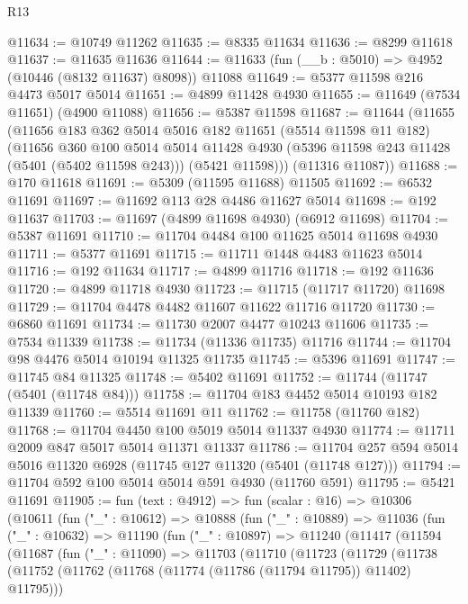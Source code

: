 \begin{lexlean}{R13}
\begin{coremodule}
@11634 := @10749 @11262
@11635 := @8335 @11634
@11636 := @8299 @11618
@11637 := @11635 @11636
@11644 := @11633 (fun (__b : @5010) => @4952 (@10446 (@8132 @11637) @8098)) @11088
@11649 := @5377 @11598 @216 @4473 @5017 @5014
@11651 := @4899 @11428 @4930
@11655 := @11649 (@7534 @11651) (@4900 @11088)
@11656 := @5387 @11598
@11687 := @11644
    (@11655
      (@11656
        @183
        @362
        @5014
        @5016
        @182
        @11651
        (@5514 @11598 @11 @182)
        (@11656
          @360
          @100
          @5014
          @5014
          @11428
          @4930
          (@5396 @11598 @243 @11428 (@5401 (@5402 @11598 @243)))
          (@5421 @11598)))
      (@11316 @11087))
@11688 := @170 @11618
@11691 := @5309 (@11595 @11688) @11505
@11692 := @6532 @11691
@11697 := @11692 @113 @28 @4486 @11627 @5014
@11698 := @192 @11637
@11703 := @11697 (@4899 @11698 @4930) (@6912 @11698)
@11704 := @5387 @11691
@11710 := @11704 @4484 @100 @11625 @5014 @11698 @4930
@11711 := @5377 @11691
@11715 := @11711 @1448 @4483 @11623 @5014
@11716 := @192 @11634
@11717 := @4899 @11716
@11718 := @192 @11636
@11720 := @4899 @11718 @4930
@11723 := @11715 (@11717 @11720) @11698
@11729 := @11704 @4478 @4482 @11607 @11622 @11716 @11720
@11730 := @6860 @11691
@11734 := @11730 @2007 @4477 @10243 @11606
@11735 := @7534 @11339
@11738 := @11734 (@11336 @11735) @11716
@11744 := @11704 @98 @4476 @5014 @10194 @11325 @11735
@11745 := @5396 @11691
@11747 := @11745 @84 @11325
@11748 := @5402 @11691
@11752 := @11744 (@11747 (@5401 (@11748 @84)))
@11758 := @11704 @183 @4452 @5014 @10193 @182 @11339
@11760 := @5514 @11691 @11
@11762 := @11758 (@11760 @182)
@11768 := @11704 @4450 @100 @5019 @5014 @11337 @4930
@11774 := @11711 @2009 @847 @5017 @5014 @11371 @11337
@11786 := @11704 @257 @594 @5014 @5016 @11320 @6928 (@11745 @127 @11320 (@5401 (@11748 @127)))
@11794 := @11704 @592 @100 @5014 @5014 @591 @4930 (@11760 @591)
@11795 := @5421 @11691
@11905 := fun (text : @4912) =>
  fun (scalar : @16) =>
  @10306
    (@10611
      (fun ("_" : @10612) =>
      @10888
        (fun ("_" : @10889) =>
        @11036
          (fun ("_" : @10632) =>
          @11190
            (fun ("_" : @10897) =>
            @11240
              (@11417
                (@11594
                  (@11687
                    (fun ("_" : @11090) =>
                    @11703
                      (@11710
                        (@11723
                          (@11729
                            (@11738
                              (@11752
                                (@11762 (@11768 (@11774 (@11786 (@11794 @11795)) @11402) @11795)))

\end{coremodule}
\end{lexlean}
